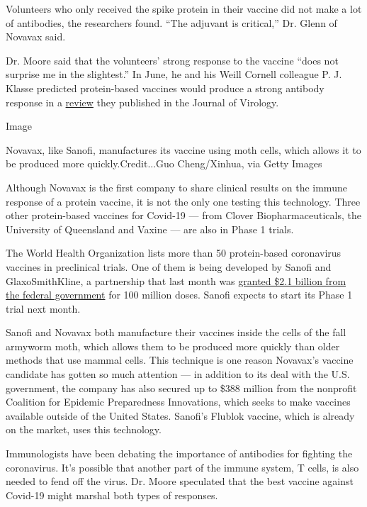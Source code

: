 Volunteers who only received the spike protein in their vaccine did not
make a lot of antibodies, the researchers found. ``The adjuvant is
critical,'' Dr. Glenn of Novavax said.

Dr. Moore said that the volunteers' strong response to the vaccine
``does not surprise me in the slightest.'' In June, he and his Weill
Cornell colleague P. J. Klasse predicted protein-based vaccines would
produce a strong antibody response in a
\href{https://jvi.asm.org/content/early/2020/06/26/JVI.01083-20}{review}
they published in the Journal of Virology.

Image

Novavax, like Sanofi, manufactures its vaccine using moth cells, which
allows it to be produced more quickly.Credit...Guo Cheng/Xinhua, via
Getty Images

Although Novavax is the first company to share clinical results on the
immune response of a protein vaccine, it is not the only one testing
this technology. Three other protein-based vaccines for Covid-19 ---
from Clover Biopharmaceuticals, the University of Queensland and Vaxine
--- are also in Phase 1 trials.

The World Health Organization lists more than 50 protein-based
coronavirus vaccines in preclinical trials. One of them is being
developed by Sanofi and GlaxoSmithKline, a partnership that last month
was
\href{https://www.nytimes3xbfgragh.onion/2020/07/31/health/covid-19-vaccine-sanofi-gsk.html}{granted
\$2.1 billion from the federal government} for 100 million doses. Sanofi
expects to start its Phase 1 trial next month.

Sanofi and Novavax both manufacture their vaccines inside the cells of
the fall armyworm moth, which allows them to be produced more quickly
than older methods that use mammal cells. This technique is one reason
Novavax's vaccine candidate has gotten so much attention --- in addition
to its deal with the U.S. government, the company has also secured up to
\$388 million from the nonprofit Coalition for Epidemic Preparedness
Innovations, which seeks to make vaccines available outside of the
United States. Sanofi's Flublok vaccine, which is already on the market,
uses this technology.

Immunologists have been debating the importance of antibodies for
fighting the coronavirus. It's possible that another part of the immune
system, T cells, is also needed to fend off the virus. Dr. Moore
speculated that the best vaccine against Covid-19 might marshal both
types of responses.

